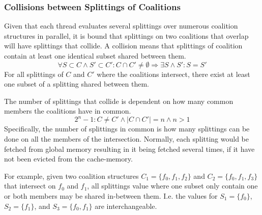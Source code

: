 \documentclass{llncs}
\begin{document}
\subsubsection{Collisions between Splittings of Coalitions} \label{sectionsplit}
Given that each thread evaluates several splittings over numerous coalition structures in parallel, 
it is bound that splittings on two coalitions that overlap will have splittings that collide.
A collision means that splittings of coalition contain at least one identical subset shared between them.
\begin{displaymath}\forall S\subset C \wedge S' \subset C' : C \cap C' \neq \emptyset \Rightarrow \exists S \wedge S' : S = S'\end{displaymath}
For all splittings of $C$ and $C'$ where the coalitions intersect, there exist at least one subset of a splitting shared between them.

The number of splittings that collide is dependent on how many common members the coalitions have in common.
\begin{displaymath}2^{n}-1:C\neq C'\wedge |C \cap C'| = n \wedge n > 1 \end{displaymath}
Specifically, the number of splittings in common is how many splittings
can be done on all the members of the intersection. Normally, each splitting would be fetched from global memory resulting in it being fetched several times, if it have not been evicted from the cache-memory.

For example, given two coalition structures $C_1 =\{f_0,f_1,f_2\}$ and $C_2 =\{f_0,f_1,f_3\}$ that intersect on $f_0$ and $f_1$, all splittings value where one subset only contain one or both members may be shared in-between them. I.e. the values for $S_1 = \{f_0\}$, $S_2 = \{f_1\}$, and $S_3 = \{f_0,f_1\}$ are interchangeable.
\end{document}
